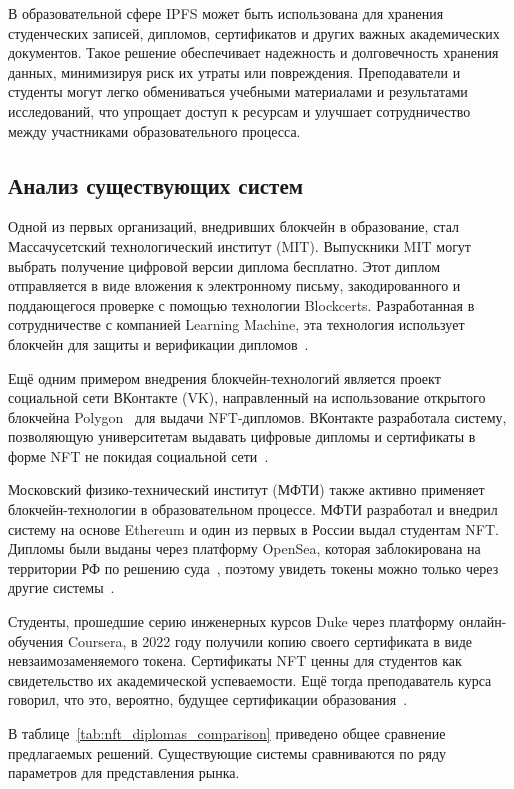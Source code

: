 В образовательной сфере IPFS может быть использована для хранения студенческих записей, дипломов, сертификатов и других важных академических документов. Такое решение обеспечивает надежность и долговечность хранения данных, минимизируя риск их утраты или повреждения. Преподаватели и студенты могут легко обмениваться учебными материалами и результатами исследований, что упрощает доступ к ресурсам и улучшает сотрудничество между участниками образовательного процесса.

\subsection{Анализ существующих систем}

Одной из первых организаций, внедривших блокчейн в образование, стал Массачусетский технологический институт (MIT). Выпускники MIT могут выбрать получение цифровой версии диплома бесплатно. Этот диплом отправляется в виде вложения к электронному письму, закодированного и поддающегося проверке с помощью технологии Blockcerts. Разработанная в сотрудничестве с компанией Learning Machine, эта технология использует блокчейн для защиты и верификации дипломов~\cite{bib:mit_diplomas}.

Ещё одним примером внедрения блокчейн-технологий является проект социальной сети ВКонтакте (VK), направленный на использование открытого блокчейна Polygon~\cite{bib:polygon} для выдачи NFT-дипломов. ВКонтакте разработала систему, позволяющую университетам выдавать цифровые дипломы и сертификаты в форме NFT не покидая социальной сети~\cite{bib:vk_nft_diploma}.

Московский физико-технический институт (МФТИ) также активно применяет блокчейн-технологии в образовательном процессе. МФТИ разработал и внедрил систему на основе Ethereum и один из первых в России выдал студентам NFT. Дипломы были выданы через платформу OpenSea, которая заблокирована на территории РФ по решению суда~\cite{bib:opensea_block}, поэтому увидеть токены можно только через другие системы~\cite{bib:mipt_nft_diploma}.

Студенты, прошедшие серию инженерных курсов Duke через платформу онлайн-обучения Coursera, в 2022 году получили копию своего сертификата в виде невзаимозаменяемого токена. Сертификаты NFT ценны для студентов как свидетельство их академической успеваемости. Ещё тогда преподаватель курса говорил, что это, вероятно, будущее сертификации образования~\cite{bib:duke_nft_diploma}.

В таблице~\ref{tab:nft_diplomas_comparison} приведено общее сравнение предлагаемых решений. Существующие системы сравниваются по ряду параметров для представления рынка.

